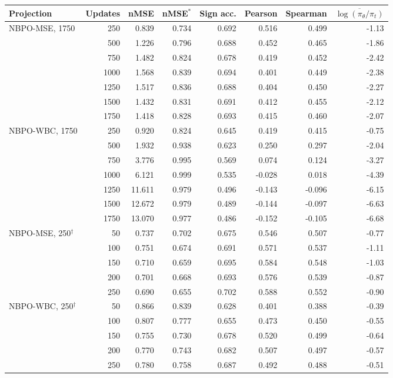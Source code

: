\begin{tabular}{lrrrrrrr}
\toprule
Projection & Updates & nMSE & nMSE$^\ast$ & Sign acc. & Pearson & Spearman & $\overline{\log(\pi_\theta/\pi_t)}$\\
\midrule
NBPO-MSE, 1750 & 250 & 0.839 & 0.734 & 0.692 & 0.516 & 0.499 & -1.13\\
 & 500 & 1.226 & 0.796 & 0.688 & 0.452 & 0.465 & -1.86\\
 & 750 & 1.482 & 0.824 & 0.678 & 0.419 & 0.452 & -2.42\\
 & 1000 & 1.568 & 0.839 & 0.694 & 0.401 & 0.449 & -2.38\\
 & 1250 & 1.517 & 0.836 & 0.688 & 0.404 & 0.450 & -2.27\\
 & 1500 & 1.432 & 0.831 & 0.691 & 0.412 & 0.455 & -2.12\\
 & 1750 & 1.418 & 0.828 & 0.693 & 0.415 & 0.460 & -2.07\\

\midrule
NBPO-WBC, 1750 & 250 & 0.920 & 0.824 & 0.645 & 0.419 & 0.415 & -0.75\\
 & 500 & 1.932 & 0.938 & 0.623 & 0.250 & 0.297 & -2.04\\
 & 750 & 3.776 & 0.995 & 0.569 & 0.074 & 0.124 & -3.27\\
 & 1000 & 6.121 & 0.999 & 0.535 & -0.028 & 0.018 & -4.39\\
 & 1250 & 11.611 & 0.979 & 0.496 & -0.143 & -0.096 & -6.15\\
 & 1500 & 12.672 & 0.979 & 0.489 & -0.144 & -0.097 & -6.63\\
 & 1750 & 13.070 & 0.977 & 0.486 & -0.152 & -0.105 & -6.68\\

\midrule
NBPO-MSE, 250$^\dagger$ & 50 & 0.737 & 0.702 & 0.675 & 0.546 & 0.507 & -0.77\\
 & 100 & 0.751 & 0.674 & 0.691 & 0.571 & 0.537 & -1.11\\
 & 150 & 0.710 & 0.659 & 0.695 & 0.584 & 0.548 & -1.03\\
 & 200 & 0.701 & 0.668 & 0.693 & 0.576 & 0.539 & -0.87\\
 & 250 & 0.690 & 0.655 & 0.702 & 0.588 & 0.552 & -0.90\\

\midrule
NBPO-WBC, 250$^\dagger$ & 50 & 0.866 & 0.839 & 0.628 & 0.401 & 0.388 & -0.39\\
 & 100 & 0.807 & 0.777 & 0.655 & 0.473 & 0.450 & -0.55\\
 & 150 & 0.755 & 0.730 & 0.678 & 0.520 & 0.499 & -0.64\\
 & 200 & 0.770 & 0.743 & 0.682 & 0.507 & 0.497 & -0.57\\
 & 250 & 0.780 & 0.758 & 0.687 & 0.492 & 0.488 & -0.51\\
\bottomrule
\end{tabular}
